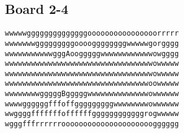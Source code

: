 \documentclass[11pt,a4paper]{article}
\begin{document}
\subsection*{Board 2-4}
\begin{lstlisting}
wwwwwggggggggggggggoooooooooooooooorrrrr
wwwwwwwgggggggggooooggggggggwwwwwgorgggg
wwwwwwwwwwwgggAoogggggwwwwwwwwwwwwowgggg
wwwwwwwwwwwwwwwwwwwwwwwwwwwwwwwwwwowwwww
wwwwwwwwwwwwwwwwwwwwwwwwwwwwwwwwwwowwwww
wwwwwwwwwwwwwwwwwwwwwwwwwwwwwwwwwoowwwww
wwwwwwwwgggggBgggggwwwwwwwwwwwwwwowwwwww
wwwwggggggfffoffgggggggggwwwwwwwwowwwwww
wwggggfffffffoffffffggggggggggggrogwwwww
wgggfffrrrrrrooooooooooooooooooooogggggg
\end{lstlisting}
\end{document}
